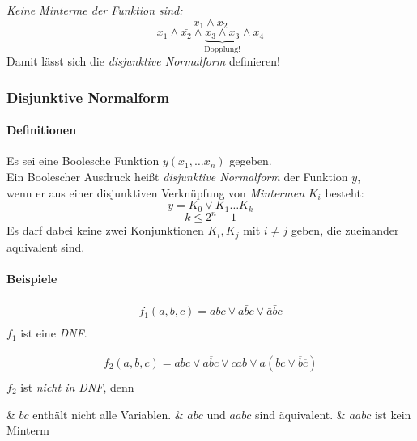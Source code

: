 \documentclass[a4paper]{scrartcl}
\begin{document}
			\emph{Keine Minterme der Funktion sind:}\\
			\[x_1 \wedge x_2 \]
			\[x_1 \wedge \bar{x_2} \wedge \underbrace{x_3 \wedge x_3}_{\text{Dopplung!}} \wedge x_4 \]
			Damit lässt sich die \emph{disjunktive Normalform} definieren!\\
			
			\subsubsection{Disjunktive Normalform}
			\paragraph{Definitionen}
			Es sei eine Boolesche Funktion \(y(x_1, \dots x_n) \) gegeben.\\
			Ein Boolescher Ausdruck heißt \emph{disjunktive Normalform} der Funktion \(y\), \\
			wenn er aus einer disjunktiven Verknüpfung von \emph{Mintermen} \(K_i\) besteht:
			\[ y = K_0 \vee K_1 \dots K_k \]
			\[ k \leq 2^n -1 \]
			Es darf dabei keine zwei Konjunktionen \( K_i, K_j \) mit \( i \neq j \) geben,
			die zueinander aquivalent sind.\\
			
			\paragraph{Beispiele}
			\begin{align*}
				f_1 (a, b, c) = abc \vee a \bar{b} c \vee \bar{a} \bar{b} c\\
			\end{align*}
			\(f_1\) ist eine \emph{DNF}.
			
			\begin{align*}
				f_2 (a, b, c) = abc \vee a \overline{b} c \vee cab \vee a(bc \vee \overline{b} \overline{c})\\
			\end{align*}
			\( f_2 \) ist \emph{nicht in DNF}, denn \\
			\begin{easylist}
				& \( \overline{b} c \) enthält nicht alle Variablen.
				& \( abc \) und \( aa\overline{b} c\) sind äquivalent.
				& \(aa \overline{b}c \) ist kein Minterm
			\end{easylist}
			
\end{document}
